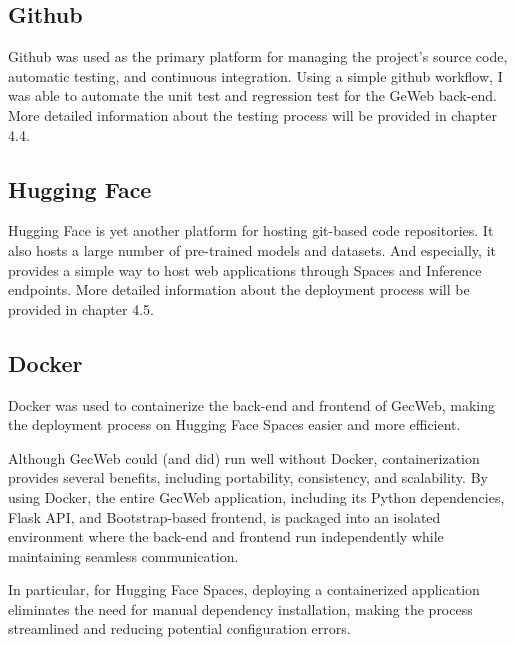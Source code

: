 \subsection{Github}
\label{github}

Github was used as the primary platform for managing the project's source code, automatic testing, and continuous integration.
Using a simple github workflow, I was able to automate the unit test and regression test for the GeWeb back-end.
More detailed information about the testing process will be provided in chapter 4.4.

\subsection{Hugging Face}
\label{hugging-face}

Hugging Face is yet another platform for hosting git-based code repositories.
It also hosts a large number of pre-trained models and datasets.
And especially, it provides a simple way to host web applications through Spaces and Inference endpoints.
More detailed information about the deployment process will be provided in chapter 4.5.

\subsection{Docker}
\label{docker}

Docker was used to containerize the back-end and frontend of GecWeb, making the deployment process on Hugging Face Spaces easier and more efficient.

Although GecWeb could (and did) run well without Docker, containerization provides several benefits, including portability, consistency, and scalability.
By using Docker, the entire GecWeb application, including its Python dependencies, Flask API, and Bootstrap-based frontend, is packaged into an isolated environment where the back-end and frontend run independently while maintaining seamless communication.

In particular, for Hugging Face Spaces, deploying a containerized application eliminates the need for manual dependency installation, making the process streamlined and reducing potential configuration errors.

%

